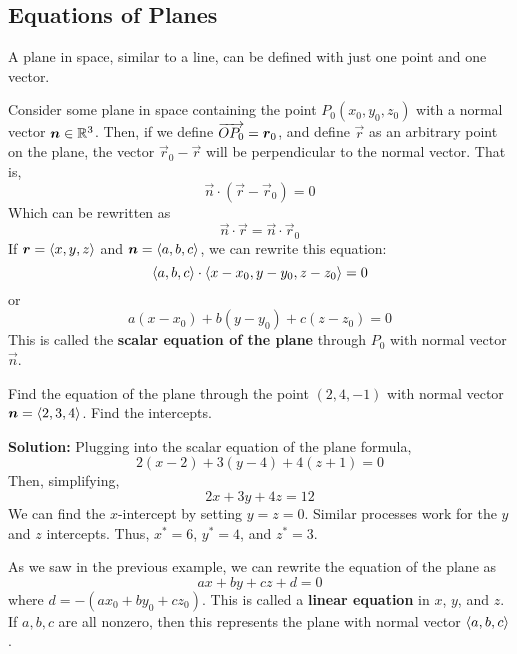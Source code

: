\subsection{Equations of Planes}
A plane in space, similar to a line, can be defined with just one point and one vector. \par
Consider some plane in space containing the point \(P_0(x_0,y_0,z_0)\) with a normal vector \(\boldsymbol{n}\in \mathbb{R}^3\). Then, if we define \(\overrightarrow{OP_0}=\boldsymbol{r}_0\), and define \(\vec r\) as an arbitrary point on the plane, the vector \(\vec r_0-\vec r\) will be perpendicular to the normal vector. That is,
\[\vec n \cdot (\vec r - \vec r_0)=0\]
Which can be rewritten as
\[\vec n \cdot \vec r = \vec n \cdot \vec r_0\]
If \(\boldsymbol{r} = \left\langle x,y,z\right\rangle\) and \(\boldsymbol{n} = \left\langle a,b,c\right\rangle\), we can rewrite this equation:
\[\left\langle a,b,c\right\rangle\cdot \left\langle x-x_0,y-y_0,z-z_0\right\rangle = 0\]
or
\[a(x-x_0)+b(y-y_0)+c(z-z_0)=0\]
This is called the \textbf{scalar equation of the plane} through \(P_0\) with normal vector \(\vec n\). 
\begin{example}
    Find the equation of the plane through the point \((2,4,-1)\) with normal vector \(\boldsymbol{n} = \left\langle2,3,4\right\rangle\). Find the intercepts.\par\textbf{Solution:} Plugging into the scalar equation of the plane formula, \[2(x-2)+3(y-4)+4(z+1)=0\]
    Then, simplifying,
    \[2x+3y+4z=12\]
    We can find the \(x\)-intercept by setting \(y=z=0\). Similar processes work for the \(y\) and \(z\) intercepts. Thus,
    \(x^*=6\), \(y^*=4\), and \(z^*=3\).
\end{example}
As we saw in the previous example, we can rewrite the equation of the plane as 
\[ax+by+cz+d=0\]
where \(d=-(ax_0+by_0+cz_0)\). This is called a \textbf{linear equation} in \(x\), \(y\), and \(z\). If \(a,b,c\) are all nonzero, then this represents the plane with normal vector \(\left\langle a,b,c\right\rangle\).

